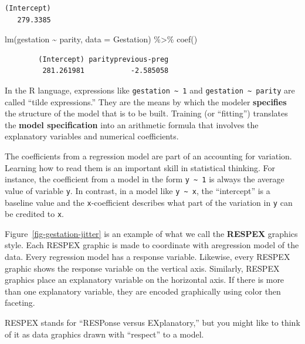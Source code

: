 \documentclass[
  letterpaper,
  DIV=11,
  numbers=noendperiod,
  oneside]{scrreprt}
\newenvironment{Shaded}{\begin{snugshade}}{\end{snugshade}}
\newcommand{\AttributeTok}[1]{\textcolor[rgb]{0.40,0.45,0.13}{#1}}
\newcommand{\FunctionTok}[1]{\textcolor[rgb]{0.28,0.35,0.67}{#1}}
\newcommand{\NormalTok}[1]{\textcolor[rgb]{0.00,0.23,0.31}{#1}}
\newcommand{\SpecialCharTok}[1]{\textcolor[rgb]{0.37,0.37,0.37}{#1}}
\begin{document}
\begin{verbatim}
(Intercept) 
   279.3385 
\end{verbatim}

\begin{Shaded}
\begin{Highlighting}[]
\FunctionTok{lm}\NormalTok{(gestation }\SpecialCharTok{\textasciitilde{}}\NormalTok{ parity, }\AttributeTok{data =}\NormalTok{ Gestation) }\SpecialCharTok{\%\textgreater{}\%} \FunctionTok{coef}\NormalTok{()}
\end{Highlighting}
\end{Shaded}

\begin{verbatim}
        (Intercept) parityprevious-preg 
         281.261981           -2.585058 
\end{verbatim}

In the R language, expressions like
\texttt{gestation\ \textasciitilde{}\ 1} and
\texttt{gestation\ \textasciitilde{}\ parity} are called ``tilde
expressions.'' They are the means by which the modeler
\textbf{specifies} the structure of the model that is to be built.
Training (or ``fitting'') translates the \textbf{model specification}
into an arithmetic formula that involves the explanatory variables and
numerical coefficients.

The coefficients from a regression model are part of an accounting for
variation. Learning how to read them is an important skill in
statistical thinking. For instance, the coefficient from a model in the
form \texttt{y\ \textasciitilde{}\ 1} is always the average value of
variable \texttt{y}. In contrast, in a model like
\texttt{y\ \textasciitilde{}\ x}, the ``intercept'' is a baseline value
and the \texttt{x}-coefficient describes what part of the variation in
\texttt{y} can be credited to \texttt{x}.

\begin{tcolorbox}[enhanced jigsaw, colbacktitle=quarto-callout-note-color!10!white, breakable, opacitybacktitle=0.6, colback=white, left=2mm, arc=.35mm, colframe=quarto-callout-note-color-frame, coltitle=black, toprule=.15mm, opacityback=0, leftrule=.75mm, bottomtitle=1mm, toptitle=1mm, titlerule=0mm, title=\textcolor{quarto-callout-note-color}{\faInfo}\hspace{0.5em}{The RESPEX graphics format}, rightrule=.15mm, bottomrule=.15mm]

Figure~\ref{fig-gestation-jitter} is an example of what we call the
\textbf{RESPEX} graphics style. Each RESPEX graphic is made to
coordinate with aregression model of the data. Every regression model
has a response variable. Likewise, every RESPEX graphic shows the
response variable on the vertical axis. Similarly, RESPEX graphics place
an explanatory variable on the horizontal axis. If there is more than
one explanatory variable, they are encoded graphically using color then
faceting.

RESPEX stands for ``RESPonse versus EXplanatory,'' but you might like to
think of it as data graphics drawn with ``respect'' to a model.

\end{tcolorbox}
\end{document}
